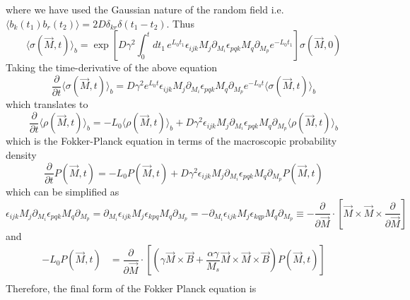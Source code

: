 \documentclass[aps,prb,onecolumn,notitlepage,showpacs,floatfix,superscriptaddress]{revtex4-1}
\begin{document}
where we have used the Gaussian nature of the random field i.e. $\langle b_k(t_1) b_r(t_2) \rangle = 2 D \delta_{kr} \delta(t_1-t_2)$. Thus
\begin{equation}
\langle \sigma(\vec{M},t) \rangle_b = \exp\left[D \gamma^2 \int_0^t dt_1 \, e^{L_0 t_1}   \epsilon_{ijk} M_j  \partial_{M_i} \epsilon_{pqk}  M_q \partial_{M_p} e^{-L_0 t_1} \right]   \sigma(\vec{M},0)
\end{equation}
Taking the time-derivative of the above equation
\begin{equation}
\dfrac{\partial}{\partial t}\langle \sigma(\vec{M},t) \rangle_b = D \gamma^2 e^{L_0 t}  \epsilon_{ijk} M_j  \partial_{M_i} \epsilon_{pqk}  M_q \partial_{M_p} e^{-L_0 t}  \langle \sigma(\vec{M},t) \rangle_b
\end{equation}
which translates to
\begin{equation}
\dfrac{\partial}{\partial t}\langle \rho(\vec{M},t) \rangle_b = -L_0 \langle \rho(\vec{M},t) \rangle_b +D \gamma^2  \epsilon_{ijk} M_j  \partial_{M_i} \epsilon_{pqk}  M_q \partial_{M_p} \langle \rho(\vec{M},t) \rangle_b
\end{equation}
which is the Fokker-Planck equation in terms of the macroscopic probability density
\begin{equation}
\dfrac{\partial}{\partial t} P(\vec{M},t) = -L_0 P(\vec{M},t)  +D \gamma^2  \epsilon_{ijk} M_j  \partial_{M_i} \epsilon_{pqk}  M_q \partial_{M_p} P(\vec{M},t) 
\end{equation}
which can be simplified as
\begin{equation}
\epsilon_{ijk} M_j  \partial_{M_i} \epsilon_{pqk}  M_q \partial_{M_p} =  \partial_{M_i} \epsilon_{ijk} M_j   \epsilon_{kpq}  M_q \partial_{M_p} =  -\partial_{M_i} \epsilon_{ijk} M_j   \epsilon_{kqp}  M_q \partial_{M_p} \equiv -\dfrac{\partial}{\partial \vec{M}} \cdot \left[\vec{M} \times \vec{M} \times \dfrac{\partial}{\partial \vec{M}}   \right]
\end{equation}
and 
\begin{equation}
\begin{split}
- L_0 P(\vec{M},t)  &=\dfrac{\partial}{\partial \vec{M}} \cdot \left[\left(\gamma \vec{M} \times \vec{B} +\dfrac{\alpha \gamma}{M_s} \vec{M} \times \vec{M} \times \vec{B}\right) P(\vec{M},t) \right]  \\
\end{split}
\end{equation}
Therefore, the final form of the Fokker Planck equation is
\end{document}
